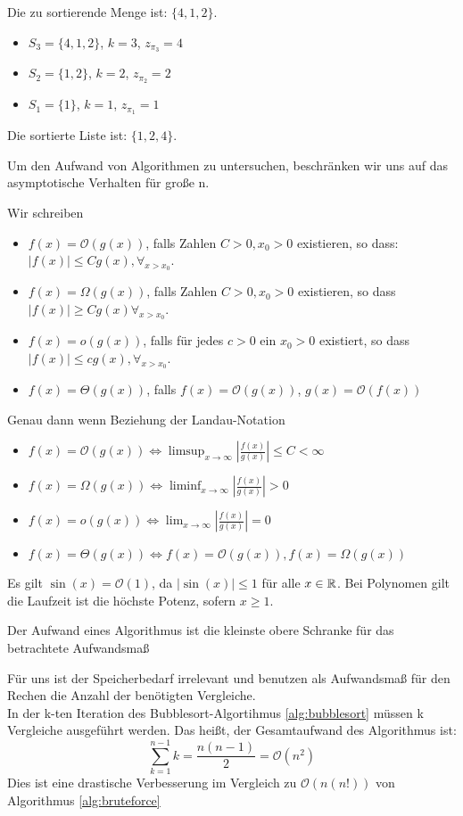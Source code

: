 \begin{example}
Die zu sortierende Menge ist: $\{4,1,2\}$.
\begin{itemize}
	\item $S_3=\{4,1,2\}$, $k=3$, $z_{\pi_3}=4$
	\item $S_2=\{1,2\}$, $k=2$, $z_{\pi_2}=2$
	\item $S_1=\{1\}$, $k=1$, $z_{\pi_1}=1$
\end{itemize}
Die sortierte Liste ist: $\{1,2,4\}$.
\end{example}
Um den Aufwand von Algorithmen zu untersuchen, beschränken wir uns auf das asymptotische Verhalten für große n.
\begin{definition}
Wir schreiben
\begin{itemize}
	\item $f(x)= \mathcal{O}(g(x))$, falls Zahlen $C>0, x_0>0$ existieren, so dass: $|f(x)|\le Cg(x), \forall_{x>x_0}$.
	\item $f(x)=\Omega(g(x))$, falls Zahlen $C>0, x_0>0$ existieren, so dass $|f(x)|\ge Cg(x) \forall_{x>x_0}$.
	\item $f(x)=o(g(x))$, falls für jedes $c>0$ ein $x_0>0$ existiert, so dass 
		$|f(x)|\le cg(x), \forall_{x>x_0}$.
	\item $f(x)= \Theta(g(x))$, falls $f(x)=\mathcal{O}(g(x))$, $g(x)= \mathcal{O}(f(x))$
\end{itemize}
\end{definition}
\begin{remark}
Genau dann wenn Beziehung der Landau-Notation
\begin{itemize}
	\item $f(x)=\mathcal{O}(g(x)) \iff \limsup_{x \to \infty} |\frac{f(x)}{g(x)}|\le C<\infty$
	\item $f(x)= \Omega(g(x)) \iff \liminf_{x \to \infty} |\frac{f(x)}{g(x)}|>0$
	\item $f(x)= o(g(x)) \iff \lim_{x \to \infty} |\frac{f(x)}{g(x)}| =0$
	\item $f(x)= \Theta(g(x)) \iff f(x)= \mathcal{O}(g(x)), f(x)= \Omega(g(x))$
\end{itemize}
\end{remark}
\begin{example}
Es gilt $\sin(x) = \mathcal{O}(1)$, da $|\sin(x)|\le 1$ für alle $x \in  \mathbb{R}$. Bei Polynomen gilt die Laufzeit ist die höchste Potenz, sofern $ x\ge 1$.
\end{example}
\begin{definition}
Der Aufwand eines Algorithmus ist die kleinste obere Schranke für das betrachtete Aufwandsmaß
\end{definition}
Für uns ist der Speicherbedarf irrelevant und benutzen als Aufwandsmaß für den Rechen die Anzahl der benötigten Vergleiche. \\
In der k-ten Iteration des Bubblesort-Algortihmus \ref{alg:bubblesort} müssen k Vergleiche ausgeführt werden. Das heißt, der Gesamtaufwand des Algorithmus ist:
\[
\sum_{k=1}^{n-1}k=\frac{n(n-1)}{2}= \mathcal{O}(n^2)
\]
Dies ist eine drastische Verbesserung im Vergleich zu $\mathcal{O}(n(n!))$ von Algorithmus \ref{alg:bruteforce}